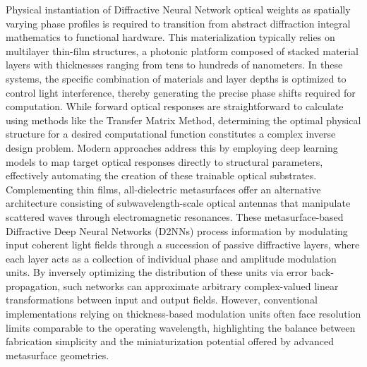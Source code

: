 Physical instantiation of Diffractive Neural Network optical weights as spatially varying phase profiles is required to transition from abstract diffraction integral mathematics to functional hardware. This materialization typically relies on multilayer thin-film structures, a photonic platform composed of stacked material layers with thicknesses ranging from tens to hundreds of nanometers. \citep{doi_10_1039_d5nh00367a_1be9a889} \citep{doi_10_1002_smtd_202400087_8e52a90c} In these systems, the specific combination of materials and layer depths is optimized to control light interference, thereby generating the precise phase shifts required for computation. While forward optical responses are straightforward to calculate using methods like the Transfer Matrix Method, determining the optimal physical structure for a desired computational function constitutes a complex inverse design problem. Modern approaches address this by employing deep learning models to map target optical responses directly to structural parameters, effectively automating the creation of these trainable optical substrates. Complementing thin films, all-dielectric metasurfaces offer an alternative architecture consisting of subwavelength-scale optical antennas that manipulate scattered waves through electromagnetic resonances. \citep{doi_10_1088_1612_202x_ab2121_c375efca} \citep{doi_10_1109_mac64480_2025_11140514_7f08c073} These metasurface-based Diffractive Deep Neural Networks (D2NNs) process information by modulating input coherent light fields through a succession of passive diffractive layers, where each layer acts as a collection of individual phase and amplitude modulation units. By inversely optimizing the distribution of these units via error back-propagation, such networks can approximate arbitrary complex-valued linear transformations between input and output fields. However, conventional implementations relying on thickness-based modulation units often face resolution limits comparable to the operating wavelength, highlighting the balance between fabrication simplicity and the miniaturization potential offered by advanced metasurface geometries. \citep{doi_10_1016_j_isci_2025_112222_1f7c10f5} \citep{doi_10_1515_nanoph_2023_0760_2c3ec088}

